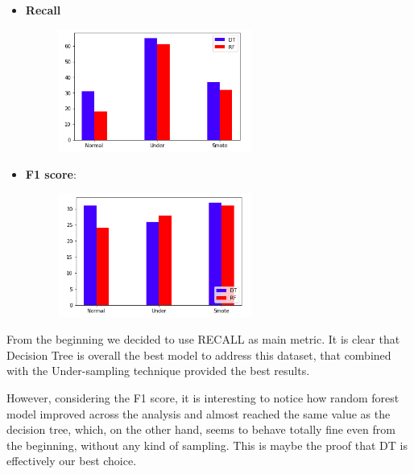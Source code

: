\begin{itemize}
\item \textbf{Recall} 

\begin{figure}[H]
\centering
\includegraphics[width=0.6\textwidth]{Img/recall_recap.png}
\end{figure}
\item \textbf{F1 score}: 

\begin{figure}[H]
\centering
\includegraphics[width=0.6\textwidth]{Img/recap_f1.png}
\end{figure}
\end{itemize}

From the beginning we decided to use RECALL as main metric. It is clear that Decision Tree is overall the best model to address this dataset, that combined with the Under-sampling technique provided the best results.

However, considering the F1 score, it is interesting to notice how random forest model improved across the analysis and almost reached the same value as the decision tree, which, on the other hand, seems to behave totally fine even from the beginning, without any kind of sampling. This is maybe the proof that DT is effectively our best choice.